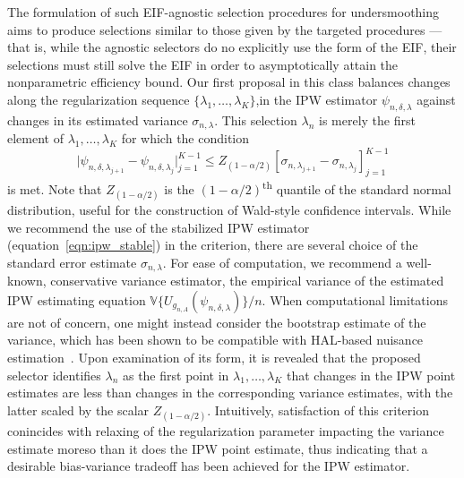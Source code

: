 The formulation of such EIF-agnostic selection procedures for undersmoothing
aims to produce selections similar to those given by the targeted procedures ---
that is, while the agnostic selectors do no explicitly use the form of the EIF,
their selections must still solve the EIF in order to asymptotically attain the
nonparametric efficiency bound. Our first proposal in this class balances
changes along the regularization sequence $\{\lambda_1, \ldots, \lambda_K \}$,in
the IPW estimator $\psi_{n,\delta,\lambda}$ against changes in its estimated
variance $\sigma_{n,\lambda}$. This selection $\lambda_n$ is merely the first
element of $\lambda_1, \ldots, \lambda_K$ for which the condition
\begin{equation}\label{eqn:plateau_var_cond}
 \lvert \psi_{n,\delta,\lambda_{j+1}} - \psi_{n,\delta,\lambda_j}
 \rvert_{j=1}^{K-1} \leq Z_{(1-\alpha/2)} [\sigma_{n,\lambda_{j+1}} -
 \sigma_{n,\lambda_j}]_{j=1}^{K-1}
\end{equation}
is met. Note that $Z_{(1-\alpha/2)}$ is the $(1-\alpha/2)$\textsuperscript{th}
quantile of the standard normal distribution, useful for the construction of
Wald-style confidence intervals. While we recommend the use of the stabilized
IPW estimator (equation~\ref{eqn:ipw_stable}) in the criterion, there are
several choice of the standard error estimate $\sigma_{n,\lambda}$. For ease of
computation, we recommend a well-known, conservative variance estimator, the
empirical variance of the estimated IPW estimating equation
$\mathbb{V}\{U_{g_{n,A}}(\psi_{n,\delta,\lambda})\} / n$. When computational
limitations are not of concern, one might instead consider the bootstrap
estimate of the variance, which has been shown to be compatible with HAL-based
nuisance estimation~\citep{cai2019nonparametric}. Upon examination of its form,
it is revealed that the proposed selector identifies $\lambda_n$ as the first
point in $\lambda_1, \ldots, \lambda_K$ that changes in the IPW point estimates
are less than changes in the corresponding variance estimates, with the latter
scaled by the scalar $Z_{(1-\alpha/2)}$. Intuitively, satisfaction of this
criterion conincides with relaxing of the regularization parameter impacting the
variance estimate moreso than it does the IPW point estimate, thus indicating
that a desirable bias-variance tradeoff has been achieved for the IPW estimator.

